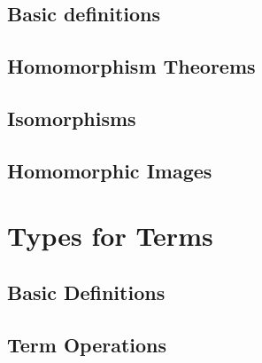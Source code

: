 \documentclass[a4paper,UKenglish,cleveref,autoref,thm-restate,11pt]{../lipics-v2021-wjd}
\begin{document}
\subsection{Basic definitions}\label{sec:basic-definitions}\firstsentence{\ualibHomBasic}{\urlHomBasic}

\subsection{Homomorphism Theorems}\label{sec:homom-theor}\firstsentence{\ualibNoether}{\urlNoether}
%
\subsection{Isomorphisms}\label{sec:isomorphisms}\firstsentence{\ualibIsomorphisms}{\urlIsomorphisms}
%
\subsection{Homomorphic Images}\label{sec:hom-images}\firstsentence{\ualibHomomorphicImages}{\urlHomomorphicImages}
%

\section{Types for Terms}\label{sec:types-terms}

\subsection{Basic Definitions}\label{sec:types-basic-defs}\firstsentence{\ualibTermsBasic}{\urlTermsBasic}
%
\subsection{Term Operations}\label{sec:term-operations}\firstsentence{\ualibOperations}{\urlOperations}
%
\end{document}
